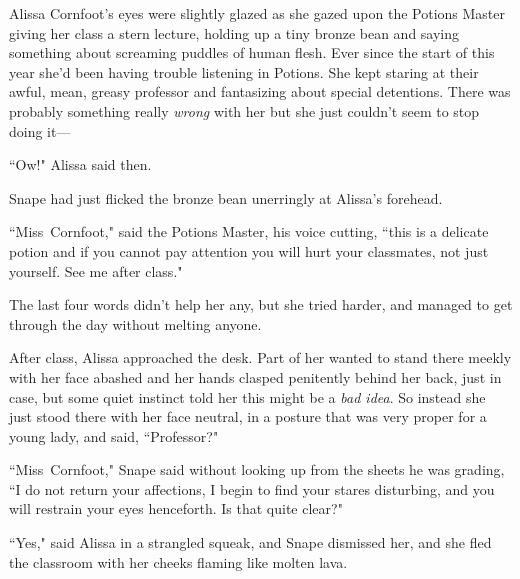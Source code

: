 Alissa Cornfoot's eyes were slightly glazed as she gazed upon the Potions Master giving her class a stern lecture, holding up a tiny bronze bean and saying something about screaming puddles of human flesh. Ever since the start of this year she'd been having trouble listening in Potions. She kept staring at their awful, mean, greasy professor and fantasizing about special detentions. There was probably something really \emph{wrong} with her but she just couldn't seem to stop doing it—

``Ow!" Alissa said then.

Snape had just flicked the bronze bean unerringly at Alissa's forehead.

``Miss~Cornfoot," said the Potions Master, his voice cutting, ``this is a delicate potion and if you cannot pay attention you will hurt your classmates, not just yourself. See me after class."

The last four words didn't help her any, but she tried harder, and managed to get through the day without melting anyone.

After class, Alissa approached the desk. Part of her wanted to stand there meekly with her face abashed and her hands clasped penitently behind her back, just in case, but some quiet instinct told her this might be a \emph{bad idea}. So instead she just stood there with her face neutral, in a posture that was very proper for a young lady, and said, ``Professor?"

``Miss~Cornfoot," Snape said without looking up from the sheets he was grading, ``I do not return your affections, I begin to find your stares disturbing, and you will restrain your eyes henceforth. Is that quite clear?"

``Yes," said Alissa in a strangled squeak, and Snape dismissed her, and she fled the classroom with her cheeks flaming like molten lava.

